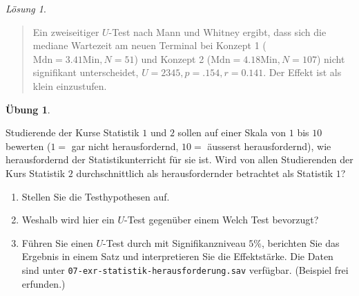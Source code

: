 \documentclass[
]{book}
\providecommand{\tightlist}{%
  \setlength{\itemsep}{0pt}\setlength{\parskip}{0pt}}
\theoremstyle{definition}
\theoremstyle{definition}
\theoremstyle{definition}
\newtheorem{exercise}{Übung}[chapter]
\theoremstyle{definition}
\theoremstyle{remark}
\newtheorem*{solution}{Lösung}
\begin{document}
\begin{solution}
\begin{quote}
Ein zweiseitiger \(U\)-Test nach Mann und Whitney ergibt, dass sich die
mediane Wartezeit am neuen Terminal bei Konzept 1
(\(\text{Mdn}= 3.41 \text{Min}, N =51\)) und Konzept 2
(\(\text{Mdn}=4.18 \text{Min}, N = 107\)) nicht signifikant
unterscheidet, \(U = 2345, p = .154, r = 0.141\). Der Effekt ist als
klein einzustufen.
\end{quote}

\end{solution}

\begin{exercise}
\protect\hypertarget{exr:statistik-herausforderung}{}\label{exr:statistik-herausforderung}\leavevmode

Studierende der Kurse Statistik \(1\) und \(2\) sollen auf einer Skala von
\(1\) bis \(10\) bewerten (\(1=\) gar nicht herausfordernd, \(10 =\) äusserst
herausfordernd), wie herausfordernd der Statistikunterricht für sie ist.
Wird von allen Studierenden der Kurs Statistik \(2\) durchschnittlich als
herausfordernder betrachtet als Statistik \(1\)?

\begin{enumerate}
\def\labelenumi{\alph{enumi})}
\tightlist
\item
  Stellen Sie die Testhypothesen auf.
\item
  Weshalb wird hier ein \(U\)-Test gegenüber einem Welch Test bevorzugt?
\item
  Führen Sie einen \(U\)-Test durch mit Signifikanzniveau \(5\%\),
  berichten Sie das Ergebnis in einem Satz und interpretieren Sie die
  Effektstärke. Die Daten sind unter
  \texttt{07-exr-statistik-herausforderung.sav} verfügbar.
  (Beispiel frei erfunden.)
\end{enumerate}

\end{exercise}
\end{document}

